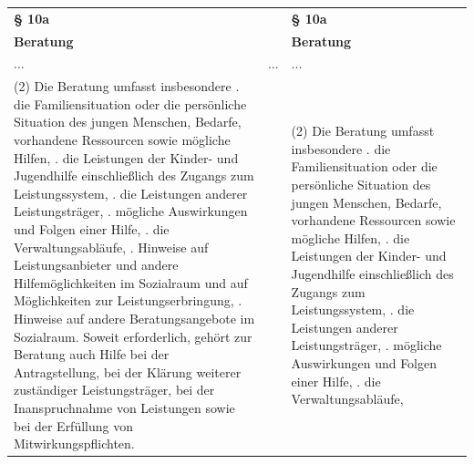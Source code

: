 \documentclass[10pt,a4paper,landscape]{article}
\begin{document}
\begin{longtable}{|L{8.2cm}|L{8.2cm}|L{8.2cm}|}
\hhline{|---|}
\textbf{\S{} 10a} &  & \textbf{\S{} 10a} \\
\hhline{|---|}
\textbf{Beratung} &  & \textbf{Beratung} \\
\hhline{|---|}
... & ... & ... \\
\hhline{|---|}
(2) Die Beratung umfasst insbesondere  .   die Familiensituation oder die  \newline persönliche Situation des jungen  \newline Menschen, Bedarfe, vorhandene  \newline Ressourcen sowie mögliche Hilfen,   . die Leistungen der Kinder- und  \newline Jugendhilfe einschließlich des Zugangs  \newline zum Leistungssystem,   . die Leistungen anderer Leistungsträger,   . mögliche Auswirkungen und Folgen  \newline einer Hilfe,   . die Verwaltungsabläufe,   . Hinweise auf Leistungsanbieter und  \newline andere Hilfemöglichkeiten im Sozialraum  und auf Möglichkeiten zur  \newline Leistungserbringung,   . Hinweise auf andere Beratungsangebote  \newline im \textcolor{diffred}{Sozialraum.}   \newline Soweit erforderlich, gehört zur Beratung  \newline auch Hilfe bei der Antragstellung, bei der  \newline Klärung weiterer zuständiger  \newline Leistungsträger, bei der Inanspruchnahme  \newline von Leistungen sowie bei der Erfüllung von  \newline Mitwirkungspflichten. &  & (2) Die Beratung umfasst insbesondere  .   die Familiensituation oder die  \newline persönliche Situation des jungen  \newline Menschen, Bedarfe, vorhandene  \newline Ressourcen sowie mögliche Hilfen,   . die Leistungen der Kinder- und  \newline Jugendhilfe einschließlich des Zugangs  \newline zum Leistungssystem,   . die Leistungen anderer Leistungsträger,   . mögliche Auswirkungen und Folgen  \newline einer Hilfe,   . die Verwaltungsabläufe,   
\end{longtable}
\end{document}
